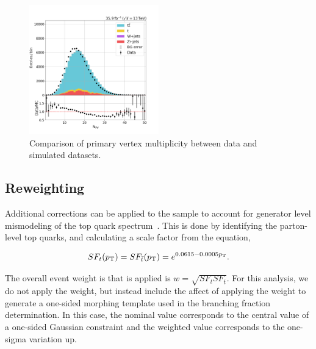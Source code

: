 \begin{figure}[ht]
    \centering
    \includegraphics[width=0.5\textwidth]{chapters/3_dataAndSimulation/figures/n_pv}
    \caption{Comparison of primary vertex multiplicity between data and simulated datasets.}
    \label{fig:dat:npv}
\end{figure}


\subsection{\cPqt \pt Reweighting}

Additional corrections can be applied to the \ttbar sample to account for generator level mismodeling of the top quark \pt spectrum~\cite{CMS-PAS-TOP-16-011, CMS-PAS-TOP-16-008}.  This is done by identifying the parton-level top quarks, and calculating a scale factor from the equation,

\begin{equation}
    \nonumber
    SF_{t}(p_{\mathrm{T}}) = SF_{\bar{t}}(p_{\mathrm{T}}) = e^{0.0615-0.0005 p_{\mathrm{T}}}.
\end{equation}


The overall event weight is that is applied is $w = \sqrt{SF_{t}SF_{\bar{t}}}$.  For this analysis, we do not apply the weight, but instead include the affect of applying the weight to generate a one-sided morphing template used in the branching fraction determination.  In this case, the nominal value corresponds to the central value of a one-sided Gaussian constraint and the weighted value corresponds to the one-sigma variation up.

